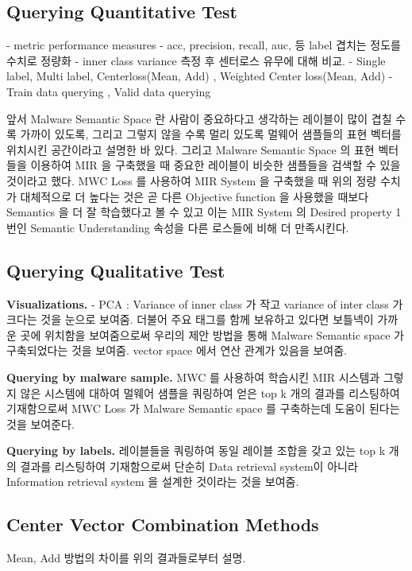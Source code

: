 \subsection{Querying Quantitative Test}
- metric performance measures
	- acc, precision, recall, auc, 등 label 겹치는 정도를 수치로 정량화
	- inner class variance 측정 후 센터로스 유무에 대해 비교. 
- Single label, Multi label, Centerloss(Mean, Add) , Weighted Center loss(Mean, Add)
- Train data querying , Valid data querying

앞서 Malware Semantic Space 란 사람이 중요하다고 생각하는 레이블이 많이 겹칠 수록 가까이 있도록, 그리고 그렇지 않을 수록 멀리 있도록 멀웨어 샘플들의 표현 벡터를 위치시킨 공간이라고 설명한 바 있다. 그리고 Malware Semantic Space 의 표현 벡터들을 이용하여 MIR 을 구축했을 때 중요한 레이블이 비슷한 샘플들을 검색할 수 있을 것이라고 했다. MWC Loss 를 사용하여 MIR System 을 구축했을 때 위의 정량 수치가 대체적으로 더 높다는 것은 곧 다른 Objective function 을 사용했을 때보다 Semantics 을 더 잘 학습했다고 볼 수 있고 이는 MIR System 의 Desired property 1 번인 Semantic Understanding 속성을 다른 로스들에 비해 더 만족시킨다.  


\subsection{Querying Qualitative Test}
\textbf{Visualizations.}
- PCA : Variance of inner class 가 작고 variance of inter class 가 크다는 것을 눈으로 보여줌. 더불어 주요 태그를 함께 보유하고 있다면 보틀넥이 가까운 곳에 위치함을 보여줌으로써 우리의 제안 방법을 통해 Malware Semantic space 가 구축되었다는 것을 보여줌.
vector space 에서 연산 관계가 있음을 보여줌.  

\textbf{Querying by malware sample. }
MWC 를 사용하여 학습시킨 MIR 시스템과 그렇지 않은 시스템에 대하여 멀웨어 샘플을 쿼링하여 얻은 top k 개의 결과를 리스팅하여 기재함으로써 MWC Loss 가 Malware Semantic space 를 구축하는데 도움이 된다는 것을 보여준다.


\textbf{Querying by labels. }
레이블들을 쿼링하여 동일 레이블 조합을 갖고 있는 top k 개의 결과를 리스팅하여 기재함으로써 단순히 Data retrieval system이 아니라 Information retrieval system 을 설계한 것이라는 것을 보여줌. 


\subsection{Center Vector Combination Methods}
Mean, Add 방법의 차이를 위의 결과들로부터 설명.

